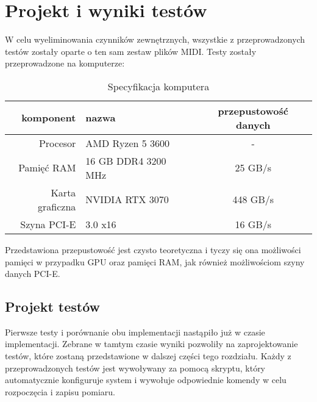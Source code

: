 \chapter{Projekt i wyniki testów}

W celu wyeliminowania czynników zewnętrznych, wszystkie z przeprowadzonych testów zostały oparte o ten sam zestaw plików MIDI. Testy zostały przeprowadzone na komputerze:

\begin{table}[H]
    \begin{center}
        \caption{Specyfikacja komputera}
        \label{tab:Specyfikacja komputera}
        \begin{tabular}{r l c}
            \hline
            \textbf{komponent} & \textbf{nazwa} & \textbf{przepustowość danych} \\
            \hline
            Procesor & AMD Ryzen 5 3600 & - \\
            \hline
            Pamięć RAM & 16 GB DDR4 3200 MHz & 25 GB/s \\
            \hline
            Karta graficzna & NVIDIA RTX 3070 & 448 GB/s \\
            \hline
            Szyna PCI-E & 3.0 x16 & 16 GB/s \\
            \hline
        \end{tabular}
    \end{center}
\end{table}

Przedstawiona przepustowość jest czysto teoretyczna i tyczy się ona możliwości pamięci w przypadku GPU oraz pamięci RAM, jak również możliwościom szyny danych PCI-E.

\section{Projekt testów}

Pierwsze testy i porównanie obu implementacji nastąpiło już w czasie implementacji. Zebrane w tamtym czasie wyniki pozwoliły na zaprojektowanie testów, które zostaną przedstawione w dalszej części tego rozdziału. Każdy z przeprowadzonych testów jest wywoływany za pomocą skryptu, który automatycznie konfiguruje system i wywołuje odpowiednie komendy w celu rozpoczęcia i zapisu pomiaru.

